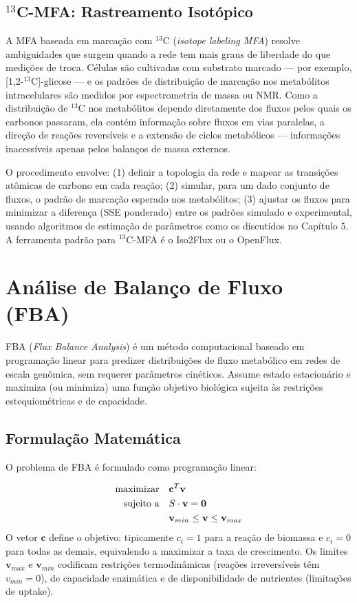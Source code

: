 \subsection{$^{13}$C-MFA: Rastreamento Isotópico}

A MFA baseada em marcação com $^{13}$C (\textit{isotope labeling MFA}) resolve ambiguidades
que surgem quando a rede tem mais graus de liberdade do que medições de troca. Células são
cultivadas com substrato marcado --- por exemplo, [1,2-$^{13}$C]-glicose --- e os padrões
de distribuição de marcação nos metabólitos intracelulares são medidos por espectrometria
de massa ou NMR. Como a distribuição de $^{13}$C nos metabólitos depende diretamente dos
fluxos pelos quais os carbonos passaram, ela contém informação sobre fluxos em vias
paralelas, a direção de reações reversíveis e a extensão de ciclos metabólicos --- informações
inacessíveis apenas pelos balanços de massa externos.

O procedimento envolve: (1) definir a topologia da rede e mapear as transições atômicas
de carbono em cada reação; (2) simular, para um dado conjunto de fluxos, o padrão de
marcação esperado nos metabólitos; (3) ajustar os fluxos para minimizar a diferença
(SSE ponderado) entre os padrões simulado e experimental, usando algoritmos de estimação
de parâmetros como os discutidos no Capítulo 5. A ferramenta padrão para $^{13}$C-MFA
é o Iso2Flux ou o OpenFlux.


\section{Análise de Balanço de Fluxo (FBA)}

\begin{definicaoenv}
FBA (\textit{Flux Balance Analysis}) é um método computacional baseado em programação linear
para predizer distribuições de fluxo metabólico em redes de escala genômica, sem requerer
parâmetros cinéticos. Assume estado estacionário e maximiza (ou minimiza) uma função
objetivo biológica sujeita às restrições estequiométricas e de capacidade.
\end{definicaoenv}

\subsection{Formulação Matemática}

O problema de FBA é formulado como programação linear:

\begin{align}
\text{maximizar} \quad & \mathbf{c}^T \mathbf{v} \notag \\
\text{sujeito a} \quad & S \cdot \mathbf{v} = \mathbf{0} \\
& \mathbf{v}_{min} \leq \mathbf{v} \leq \mathbf{v}_{max} \notag
\end{align}
O vetor $\mathbf{c}$ define o objetivo: tipicamente $c_i = 1$ para a reação de biomassa e
$c_i = 0$ para todas as demais, equivalendo a maximizar a taxa de crescimento. Os limites
$\mathbf{v}_{max}$ e $\mathbf{v}_{min}$ codificam restrições termodinâmicas (reações
irreversíveis têm $v_{min} = 0$), de capacidade enzimática e de disponibilidade de
nutrientes (limitações de uptake).


